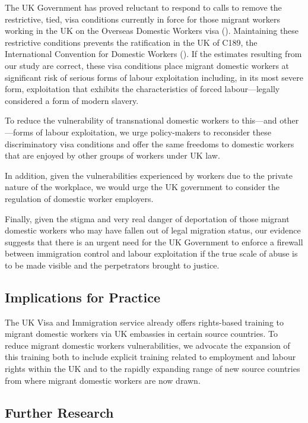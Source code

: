\documentclass[
  12pt,
  letterpaper,
  DIV=11,
  numbers=noendperiod]{scrartcl}
\theoremstyle{plain}
\theoremstyle{definition}
\begin{document}
The UK Government has proved reluctant to respond to calls to remove the
restrictive, tied, visa conditions currently in force for those migrant
workers working in the UK on the Overseas Domestic Workers visa
(\textcite{gower_calls_2016}). Maintaining these restrictive conditions
prevents the ratification in the UK of C189, the International
Convention for Domestic Workers (\textcite{ILO11-indicators}). If the
estimates resulting from our study are correct, these visa conditions
place migrant domestic workers at significant risk of serious forms of
labour exploitation including, in its most severe form, exploitation
that exhibits the characteristics of forced labour---legally considered
a form of modern slavery.

To reduce the vulnerability of transnational domestic workers to
this---and other---forms of labour exploitation, we urge policy-makers
to reconsider these discriminatory visa conditions and offer the same
freedoms to domestic workers that are enjoyed by other groups of workers
under UK law.

In addition, given the vulnerabilities experienced by workers due to the
private nature of the workplace, we would urge the UK government to
consider the regulation of domestic worker employers.

Finally, given the stigma and very real danger of deportation of those
migrant domestic workers who may have fallen out of legal migration
status, our evidence suggests that there is an urgent need for the UK
Government to enforce a firewall between immigration control and labour
exploitation if the true scale of abuse is to be made visible and the
perpetrators brought to justice.

\subsection{Implications for Practice}\label{implications-for-practice}

The UK Visa and Immigration service already offers rights-based training
to migrant domestic workers via UK embassies in certain source
countries. To reduce migrant domestic workers vulnerabilities, we
advocate the expansion of this training both to include explicit
training related to employment and labour rights within the UK and to
the rapidly expanding range of new source countries from where migrant
domestic workers are now drawn.

\subsection{Further Research}\label{further-research}
\end{document}
